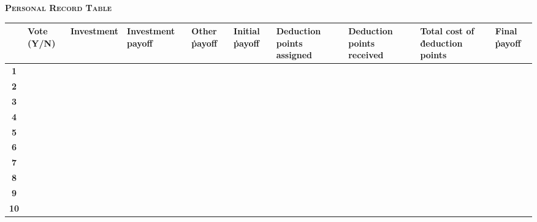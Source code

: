 \documentclass[12pt]{article}
\begin{document}
\begin{landscape}

{\bf \scshape Personal Record Table}


\begin{table}[H]
\centering
      \begin{tabular}{|c|p{2cm}|p{2.5cm}|p{2.5cm}|p{2cm}|p{2cm}|p{2cm}|p{2cm}|p{2.5cm}|p{2cm}|} \hline

         & {\bf Vote (Y/N)}
         & {\bf Investment}
         & {\bf Investment payoff}
         & {\bf Other \.  payoff}
         & {\bf Initial \. payoff}
         & {\bf Deduction points assigned}
         & {\bf Deduction points received}
         & {\bf Total cost of \. deduction points}
         & {\bf Final \. payoff}\\
         
         \hline\hline
         
         {\bf 1} & & & & & & & & & \\[2ex]\hline
         {\bf 2} & & & & & & & & & \\[2ex]\hline  
         {\bf 3} & & & & & & & & & \\[2ex]\hline
         {\bf 4} & & & & & & & & & \\[2ex]\hline
         {\bf 5} & & & & & & & & & \\[2ex]\hline
         {\bf 6} & & & & & & & & & \\[2ex]\hline
         {\bf 7} & & & & & & & & & \\[2ex]\hline
         {\bf 8} & & & & & & & & & \\[2ex]\hline
         {\bf 9} & & & & & & & & & \\[2ex]\hline
         {\bf 10} & & & & & & & & & \\[2ex]\hline
         
         \hline






      \end{tabular}
\end{table}

\end{landscape}

\fi

\end{document}
